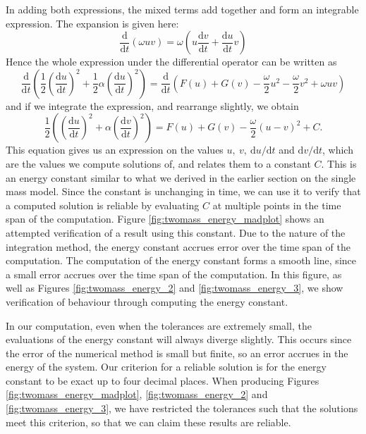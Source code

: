 In adding both expressions, the mixed terms add together and form an integrable expression.
The expansion is given here:
\begin{equation*}
    \frac{\mathrm{d}}{\mathrm{d}t}(\omega uv) = \omega \left( u \frac{\mathrm{d}v}{\mathrm{d}t} + \frac{\mathrm{d}u}{\mathrm{d}t} v \right)
\end{equation*}
Hence the whole expression under the differential operator can be written as
\begin{equation*}
    \frac{\mathrm{d}}{\mathrm{d}t}\left(
        \frac{1}{2}\left(\frac{\mathrm{d}u}{\mathrm{d}t}\right)^2 + \frac{1}{2}\alpha\left(\frac{\mathrm{d}u}{\mathrm{d}t}\right)^2
    \right) = \frac{\mathrm{d}}{\mathrm{d}t}\left(
        F(u) + G(v) - \frac{\omega}{2}u^2 -\frac{\omega}{2}v^2 + \omega uv
    \right) 
\end{equation*}
and if we integrate the expression, and rearrange slightly, we obtain
\begin{equation}
    \frac{1}{2}\left(
        \left(\frac{\mathrm{d}u}{\mathrm{d}t}\right)^2 + \alpha \left(\frac{\mathrm{d}v}{\mathrm{d}t}\right)^2
    \right) = F(u) + G(v) - \frac{\omega}{2}(u-v)^2 + C.
    \label{eqn:twomass_energy_constant}
\end{equation}
This equation gives us an expression on the values \(u,~v,~\mathrm{d}u/\mathrm{d}t\) and \(\mathrm{d}v/\mathrm{d}t\),
which are the values we compute solutions of, and relates them to a constant $C$.
This is an energy constant similar to what we derived in the earlier section on the single mass model.
Since the constant is unchanging in time, we can use it to verify that a computed solution is reliable by evaluating $C$ at multiple points in the time span of the computation.
Figure \ref{fig:twomass_energy_madplot} shows an attempted verification of a result using this constant.
Due to the nature of the integration method,
the energy constant accrues error over the time span of the computation.
The computation of the energy constant forms a smooth line,
since a small error accrues over the time span of the computation.
In this figure, as well as Figures \ref{fig:twomass_energy_2} and \ref{fig:twomass_energy_3},
we show verification of behaviour through computing the energy constant.

In our computation, even when the tolerances are extremely small,
the evaluations of the energy constant will always diverge slightly.
This occurs since the error of the numerical method is small but finite,
so an error accrues in the energy of the system.
Our criterion for a reliable solution is for the energy constant to be exact up to four decimal places.
When producing Figures \ref{fig:twomass_energy_madplot}, \ref{fig:twomass_energy_2} and \ref{fig:twomass_energy_3}, we have restricted the tolerances such that the solutions meet this criterion,
so that we can claim these results are reliable.

